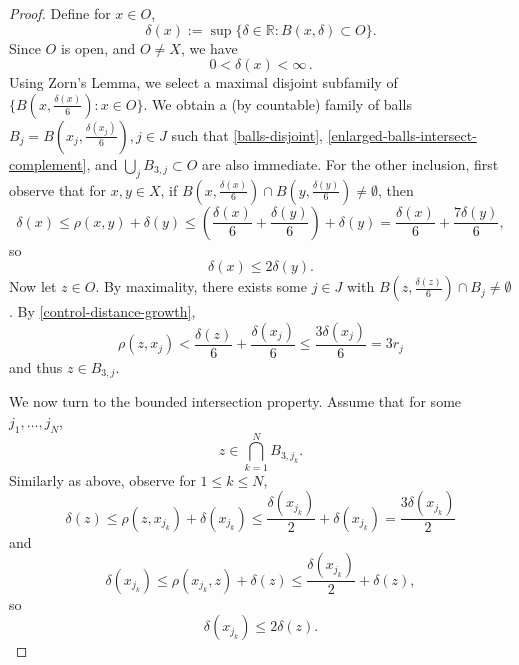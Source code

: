 \documentclass[10pt,a4paper]{article}
\theoremstyle{plain}
\theoremstyle{definition}
\numberwithin{equation}{subsection}
\newcommand{\R}{{\mathbb{R}}}
\newcommand{\leanok}{}
\begin{document}
\begin{proof}
\leanok
Define for $x\in O$,
\begin{equation}
    \delta(x):= \sup \{\delta\in\R : B(x,\delta)\subset O\}.
\end{equation}
Since $O$ is open, and $O\ne X$, we have
\begin{equation}
    0 < \delta(x) < \infty \,.
\end{equation}
Using Zorn's Lemma, we select a maximal disjoint subfamily of $\{B(x,\frac{\delta(x)}{6}) : x \in O\}$.
We obtain a (by  countable) family of balls $B_j = B(x_j, \frac{\delta(x_j)}{6}), j \in J$ such that \eqref{balls-disjoint}, \eqref{enlarged-balls-intersect-complement}, and $\bigcup_j B_{3,j} \subset O$ are also immediate. For the other inclusion, first observe that for $x,y\in X$,  if $B(x,\frac{\delta(x)}{6}) \cap B(y,\frac{\delta(y)}{6}) \ne \emptyset$, then
\begin{equation*}
    \delta(x) \le \rho(x,y) + \delta(y) \le (\frac{\delta(x)}{6} + \frac{\delta(y)}{6}) + \delta(y) = \frac{\delta(x)}{6} + \frac{7\delta(y)}{6},
\end{equation*}
so
\begin{equation}
    \label{control-distance-growth}
    \delta(x) \le 2 \delta(y).
\end{equation}
Now let $z\in O$. By maximality, there exists some $j\in J$ with $B(z,\frac{\delta(z)}{6}) \cap B_j \ne \emptyset$. By \eqref{control-distance-growth},
\begin{equation*}
    \rho(z,x_j)< \frac{\delta(z)}{6} + \frac{\delta(x_j)}{6} \le \frac{3\delta(x_j)}{6} = 3r_j
\end{equation*}
and thus $z\in B_{3,j}$.

We now turn to the bounded intersection property. Assume that for some $j_1,\dots,j_N$,
\begin{equation}
    z\in \bigcap_{k=1}^N B_{3,j_k}.
\end{equation}
Similarly as above, observe for $1\le k \le N$,
\begin{equation}
    \label{control-distance-growth-b}
    \delta(z) \le \rho(z,x_{j_k}) + \delta(x_{j_k}) \le \frac{\delta(x_{j_k})}{2} + \delta(x_{j_k}) = \frac{3\delta(x_{j_k})}{2}
\end{equation}
and
\begin{equation*}
    \delta(x_{j_k}) \le \rho(x_{j_k},z) + \delta(z) \le \frac{\delta(x_{j_k})}{2} + \delta(z),
\end{equation*}
so
\begin{equation}
    \label{control-distance-growth-c}
    \delta(x_{j_k}) \le 2 \delta(z).
\end{equation}


\end{proof}
\end{document}
